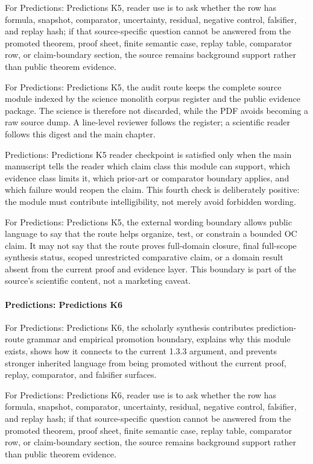 For Predictions: Predictions K5, reader use is to ask whether the row has formula, snapshot, comparator, uncertainty, residual, negative control, falsifier, and replay hash; if that source-specific question cannot be answered from the promoted theorem, proof sheet, finite semantic case, replay table, comparator row, or claim-boundary section, the source remains background support rather than public theorem evidence.


For Predictions: Predictions K5, the audit route keeps the complete source module indexed by the science monolith corpus register and the public evidence package. The science is therefore not discarded, while the PDF avoids becoming a raw source dump. A line-level reviewer follows the register; a scientific reader follows this digest and the main chapter.


Predictions: Predictions K5 reader checkpoint is satisfied only when the main manuscript tells the reader which claim class this module can support, which evidence class limits it, which prior-art or comparator boundary applies, and which failure would reopen the claim. This fourth check is deliberately positive: the module must contribute intelligibility, not merely avoid forbidden wording.


For Predictions: Predictions K5, the external wording boundary allows public language to say that the route helps organize, test, or constrain a bounded OC claim. It may not say that the route proves full-domain closure, final full-scope synthesis status, scoped unrestricted comparative claim, or a domain result absent from the current proof and evidence layer. This boundary is part of the source's scientific content, not a marketing caveat.


\paragraph{Predictions: Predictions K6}

For Predictions: Predictions K6, the scholarly synthesis contributes prediction-route grammar and empirical promotion boundary, explains why this module exists, shows how it connects to the current 1.3.3 argument, and prevents stronger inherited language from being promoted without the current proof, replay, comparator, and falsifier surfaces.


For Predictions: Predictions K6, reader use is to ask whether the row has formula, snapshot, comparator, uncertainty, residual, negative control, falsifier, and replay hash; if that source-specific question cannot be answered from the promoted theorem, proof sheet, finite semantic case, replay table, comparator row, or claim-boundary section, the source remains background support rather than public theorem evidence.


